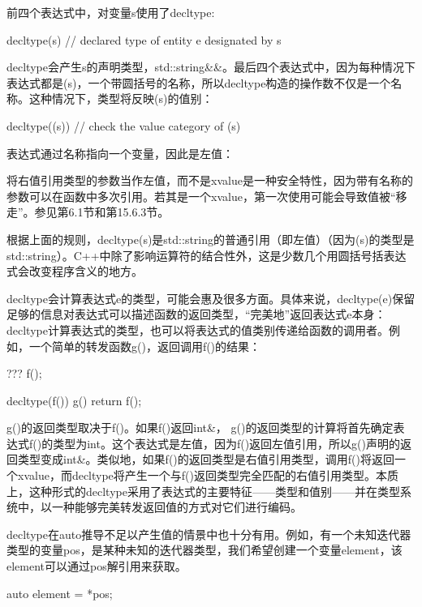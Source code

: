前四个表达式中，对变量s使用了decltype:

\begin{cpp}
decltype(s) // declared type of entity e designated by s
\end{cpp}

decltype会产生s的声明类型，std::string\&\&。最后四个表达式中，因为每种情况下表达式都是(s)，一个带圆括号的名称，所以decltype构造的操作数不仅是一个名称。这种情况下，类型将反映(s)的值别：

\begin{cpp}
decltype((s)) // check the value category of (s)
\end{cpp}

表达式通过名称指向一个变量，因此是左值：

\begin{notice}
将右值引用类型的参数当作左值，而不是xvalue是一种安全特性，因为带有名称的参数可以在函数中多次引用。若其是一个xvalue，第一次使用可能会导致值被“移走”。参见第6.1节和第15.6.3节。
\end{notice}

根据上面的规则，decltype(s)是std::string的普通引用（即左值）（因为(s)的类型是std::string）。C++中除了影响运算符的结合性外，这是少数几个用圆括号括表达式会改变程序含义的地方。

decltype会计算表达式e的类型，可能会惠及很多方面。具体来说，decltype(e)保留足够的信息对表达式可以描述函数的返回类型，“完美地”返回表达式e本身：decltype计算表达式的类型，也可以将表达式的值类别传递给函数的调用者。例如，一个简单的转发函数g()，返回调用f()的结果：

\begin{cpp}
??? f();

decltype(f()) g()
{
	return f();
}
\end{cpp}

g()的返回类型取决于f()。如果f()返回int\&， g()的返回类型的计算将首先确定表达式f()的类型为int。这个表达式是左值，因为f()返回左值引用，所以g()声明的返回类型变成int\&。类似地，如果f()的返回类型是右值引用类型，调用f()将返回一个xvalue，而decltype将产生一个与f()返回类型完全匹配的右值引用类型。本质上，这种形式的decltype采用了表达式的主要特征——类型和值别——并在类型系统中，以一种能够完美转发返回值的方式对它们进行编码。

decltype在auto推导不足以产生值的情景中也十分有用。例如，有一个未知迭代器类型的变量pos，是某种未知的迭代器类型，我们希望创建一个变量element，该element可以通过pos解引用来获取。

\begin{cpp}
auto element = *pos;
\end{cpp}

